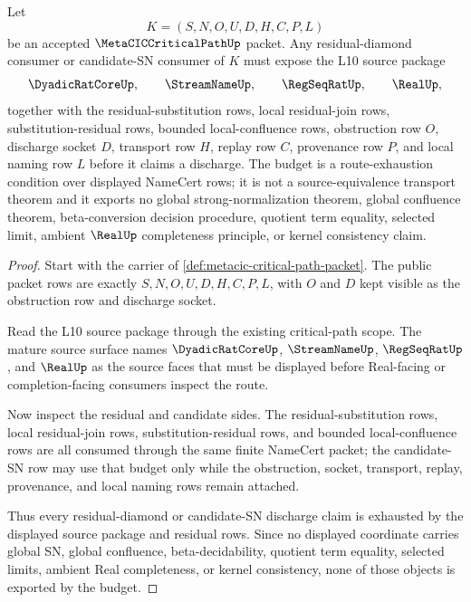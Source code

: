\begin{theorem}
\label{thm:metacic-critical-path-residual-diamond-source-package-budget}
Let
$$
K=(S,N,O,U,D,H,C,P,L)
$$
be an accepted $\MetaCICCriticalPathUp$ packet. Any residual-diamond consumer or candidate-SN consumer of $K$ must expose the L10 source package
$$
\DyadicRatCoreUp,\qquad
\StreamNameUp,\qquad
\RegSeqRatUp,\qquad
\RealUp,
$$
together with the residual-substitution rows, local residual-join rows, substitution-residual rows, bounded local-confluence rows, obstruction row $O$, discharge socket $D$, transport row $H$, replay row $C$, provenance row $P$, and local naming row $L$ before it claims a discharge. The budget is a route-exhaustion condition over displayed NameCert rows; it is not a source-equivalence transport theorem and it exports no global strong-normalization theorem, global confluence theorem, beta-conversion decision procedure, quotient term equality, selected limit, ambient $\RealUp$ completeness principle, or kernel consistency claim.
\end{theorem}
\begin{proof}
Start with the carrier of \autoref{def:metacic-critical-path-packet}. The public packet rows are exactly $S,N,O,U,D,H,C,P,L$, with $O$ and $D$ kept visible as the obstruction row and discharge socket.

Read the L10 source package through the existing critical-path scope. The mature source surface names $\DyadicRatCoreUp$, $\StreamNameUp$, $\RegSeqRatUp$, and $\RealUp$ as the source faces that must be displayed before Real-facing or completion-facing consumers inspect the route.

Now inspect the residual and candidate sides. The residual-substitution rows, local residual-join rows, substitution-residual rows, and bounded local-confluence rows are all consumed through the same finite NameCert packet; the candidate-SN row may use that budget only while the obstruction, socket, transport, replay, provenance, and local naming rows remain attached.

Thus every residual-diamond or candidate-SN discharge claim is exhausted by the displayed source package and residual rows. Since no displayed coordinate carries global SN, global confluence, beta-decidability, quotient term equality, selected limits, ambient Real completeness, or kernel consistency, none of those objects is exported by the budget.
\end{proof}

